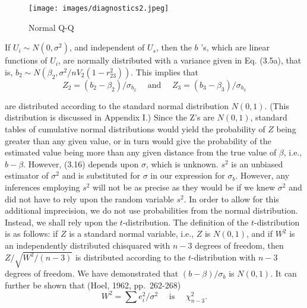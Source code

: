 \documentclass[
  10pt,
  letterpaper,
  a4paper, twoside]{scrreprt}
\begin{document}
\begin{figure}[H]

{\centering \texttt{[image: images/diagnostics2.jpeg]}

}

\caption{Normal Q-Q}

\end{figure}%

\begin{tcolorbox}[enhanced jigsaw, coltitle=black, opacitybacktitle=0.6, toptitle=1mm, colbacktitle=quarto-callout-warning-color!10!white, colback=white, toprule=.15mm, opacityback=0, bottomrule=.15mm, arc=.35mm, colframe=quarto-callout-warning-color-frame, leftrule=.75mm, titlerule=0mm, breakable, left=2mm, rightrule=.15mm, title={IYI (∉ Klausur): Ableitung für \(U_i \sim N\left(0, \sigma^2\right)\) .}, bottomtitle=1mm]

If \(U_i \sim N\left(0, \sigma^2\right)\), and independent of \(U_s\),
then the \(b\) 's, which are linear functions of \(U_i\), are normally
distributed with a variance given in Eq. (3.5a), that is,
\(b_2 \sim N\left(\beta_2, \sigma^2 / n V_2\left(1-r_{23}^2\right)\right)\).
This implies that \[
Z_2=\left(b_2-\beta_2\right) / \sigma_{b_2} \quad \text { and } \quad Z_3=\left(b_3-\beta_3\right) / \sigma_{b_3}
\]

are distributed according to the standard normal distribution
\(N(0,1)\). (This distribution is discussed in Appendix I.) Since the
Z's are \(N(0,1)\), standard tables of cumulative normal distributions
would yield the probability of \(Z\) being greater than any given value,
or in turn would give the probability of the estimated value being more
than any given distance from the true value of \(\beta\), i.e.,
\(b-\beta\). However, (3.16) depends upon \(\sigma\), which is unknown.
\(s^2\) is an unbiased estimator of \(\sigma^2\) and is substituted for
\(\sigma\) in our expression for \(\sigma_b\). However, any inferences
employing \(s^2\) will not be as precise as they would be if we knew
\(\sigma^2\) and did not have to rely upon the random variable \(s^2\).
In order to allow for this additional imprecision, we do not use
probabilities from the normal distribution. Instead, we shall rely upon
the \(t\)-distribution. The definition of the \(t\)-distribution is as
follows: if \(Z\) is a standard normal variable, i.e., \(Z\) is
\(N(0,1)\), and if \(W^2\) is an independently distributed chisquared
with \(n-3\) degrees of freedom, then \(Z / \sqrt{W^2 /(n-3)}\) is
distributed according to the \(t\)-distribution with \(n-3\) degrees of
freedom. We have demonstrated that \((b-\beta) / \sigma_b\) is
\(N(0,1)\). It can further be shown that (Hoel, 1962, pp.~262-268) \[
W^2=\sum e_i^2 / \sigma^2 \quad \text { is } \quad \chi_{n-3}^2 .
\]


\end{tcolorbox}
\end{document}

